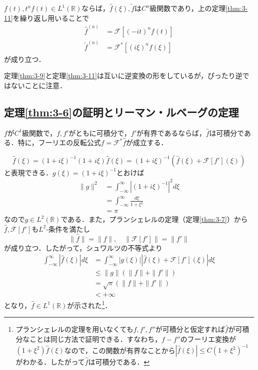 \documentclass[dvipdfmx,a4j,10pt]{jsarticle}
\makeatletter
\theoremstyle{mystyle1}
\theoremstyle{mystyle3}
\theoremstyle{mystyle4}
\theoremstyle{mystyle6}
\theoremstyle{mystyle2}
\theoremstyle{mystyle5}
\newtheorem{theorem*}{定理}
\renewenvironment{proof}[1][\proofname]{\par
  \pushQED{\qed}%
  \normalfont
  \topsep6\p@\@plus6\p@ \trivlist
  \item[\hskip\labelsep{\bfseries\sffamily #1}]\ignorespaces
}{%
  \popQED\endtrivlist\@endpefalse
}
\renewcommand\proofname{証明}
\newenvironment{thm*}[1][]
{\begin{tcolorbox}[
    enhanced,
    boxrule=0pt,
    arc=0mm,
    frame hidden,
    borderline west={2pt}{-4pt}{red},
    breakable = true
    ]
    \begin{theorem*}[#1]
}
{\end{theorem*}\end{tcolorbox}}
\makeatother
\begin{document}
$f(t),t^nf(t)\in L^1(\mathbb{R})$ならば，$\hat f(\xi),\check f$は$C^n$級関数であり，上の定理\ref{thm:3-11}を繰り返し用いることで
\[
	\begin{split}
		\hat f^{(n)}&=\mathcal{F}[(-it)^nf(t)] \\
		\check f^{(n)}&=\mathcal{F}^*[(i\xi)^n f(\xi)]
	\end{split}
\]
が成り立つ．

定理\ref{thm:3-9}と定理\ref{thm:3-11}は互いに逆変換の形をしているが，ぴったり逆ではないことに注意．


\subsection{定理\ref{thm:3-6}の証明とリーマン・ルベーグの定理}\label{sec:3-7}

\begin{thm*}
	$f$が$C^1$級関数で，$f,f'$がともに可積分で，$f'$が有界であるならば，$\hat f$は可積分である．特に，フーリエの反転公式$f=\mathcal{F}^*\hat f$が成立する．
\end{thm*}

\begin{proof}
	\[
		\hat f(\xi)	=(1+i\xi)^{-1}(1+i\xi)\hat f(\xi)=(1+i\xi)^{-1}(\hat f(\xi)+\mathcal{F}[f'](\xi))
	\]
	と表現できる．$g(\xi)=(1+i\xi)^{-1}$とおけば
	\[
		\begin{split}
			\|g\|^2&=\int_{-\infty}^\infty|(1+i\xi)^{-1}|^2d\xi \\
			&=\int_{-\infty}^\infty \frac{d\xi}{1+\xi^2} \\
			&=\pi
		\end{split}
	\]
	なので$g\in L^2(\mathbb{R})$である．また，プランシェレルの定理（定理\ref{thm:3-7}）から$\hat f,\mathcal{F}[f']$も$L^2$-条件を満たし
	\[
		\|\hat f\|=\|f\|,\quad\|\mathcal{F}[f']\|=\|f'\|
	\]
	が成り立つ．したがって，シュワルツの不等式より
	\[
		\begin{split}
			\int_{-\infty}^\infty|\hat f(\xi)|d\xi
			&=\int_{-\infty}^\infty |g(\xi)||\hat f(\xi)+\mathcal{F}[f'](\xi)|d\xi \\
			&\leq\|g\|(\|f\|+\|f'\|) \\
			&=\sqrt{\pi}(\|f\|+\|f'\|) \\
			&<+\infty
		\end{split}
	\]
	となり，$\hat f\in L^1(\mathbb{R})$が示された\footnote{プランシェレルの定理を用いなくても$f,f',f''$が可積分と仮定すれば$\hat f$が可積分なことは同じ方法で証明できる．すなわち，$f-f''$のフーリエ変換が$(1+\xi^2)\hat f(\xi)$なので，この関数が有界なことから$|\hat f(\xi)|\leq C(1+\xi^2)^{-1}$がわかる．したがって$\hat f$は可積分である．}．
\end{proof}
\end{document}
